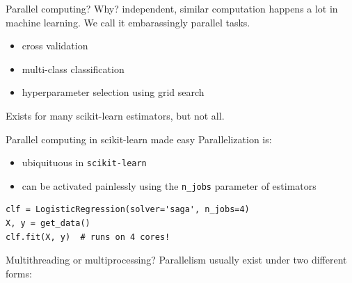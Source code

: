 \documentclass[13pt, usenames,dvipsnames]{beamer} %
\newcommand{\mycode}[2][\tiny] {\texttt{#2}}
\begin{document}
    \begin{frame}[t]{Parallel computing? Why?}
        \small
        \vspace{1cm}
        independent, similar computation happens a lot in machine learning. We
        call it embarassingly parallel tasks.
        \vspace{1cm}
        \begin{itemize}
            \item cross validation
            \item multi-class classification
            \item hyperparameter selection using grid search
        \end{itemize}
        \vspace{1cm}
        \begin{flushright}
            \small
        Exists for many scikit-learn estimators, but not all.
        \end{flushright}
    \end{frame}

    \begin{frame}[fragile]{Parallel computing in scikit-learn made easy}
        \small
        Parallelization is:
        \begin{itemize}
            \item ubiquituous in \mycode{scikit-learn}
            \item can be activated painlessly using the \mycode{n_jobs} parameter of estimators
        \end{itemize}
        \begin{beamerboxesrounded}{}
            \begin{verbatim}
clf = LogisticRegression(solver='saga', n_jobs=4)
X, y = get_data()
clf.fit(X, y)  # runs on 4 cores!
            \end{verbatim}
        \end{beamerboxesrounded}{}
    \end{frame}
    \begin{frame}[fragile]{Multithreading or multiprocessing?}
        Parallelism usually exist under two different forms:
    \end{frame}
\end{document}
